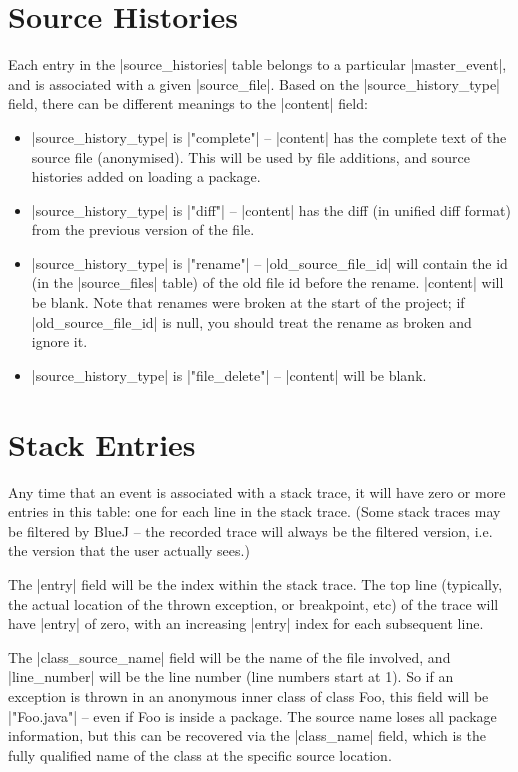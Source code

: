 \documentclass{report}
\begin{document}
\section{Source Histories}


Each entry in the |source_histories| table belongs to a particular
|master_event|, and is associated with a given |source_file|.  Based on the
|source_history_type| field, there can be different meanings to the |content| field:

\begin{itemize}
\item |source_history_type| is |"complete"| -- |content| has the complete text
  of the source file (anonymised).  This will be
  used by file additions, and source histories added on loading a package.
\item |source_history_type| is |"diff"| -- |content| has the diff (in unified diff format) from
  the previous version of the file.
\item |source_history_type| is |"rename"| -- |old_source_file_id| will contain the
  id (in the |source_files| table) of the old file id before the rename.  |content| will be blank.
  Note that renames were broken at the start of the project; if |old_source_file_id| is null, you should
  treat the rename as broken and ignore it.
\item |source_history_type| is |"file_delete"| -- |content| will be blank.
\end{itemize}

\section{Stack Entries}


Any time that an event is associated with a stack trace, it will have
zero or more entries in this table: one for each line in the stack
trace.  (Some stack traces may be filtered by BlueJ -- the recorded
trace will always be the filtered version, i.e. the version that the
user actually sees.)

The |entry| field will be the index within the stack trace.  The top
line (typically, the actual location of the thrown exception, or
breakpoint, etc) of the trace will have |entry| of zero, with an
increasing |entry| index for each subsequent line.

The |class_source_name| field will be the name of the file involved,
and |line_number| will be the line number (line numbers start at 1).
So if an exception is thrown in an anonymous inner class of class Foo,
this field will be |"Foo.java"| -- even if Foo is inside a package.
The source name loses all package information, but this can be
recovered via the |class_name| field, which is the fully qualified
name of the class at the specific source location.
\end{document}
